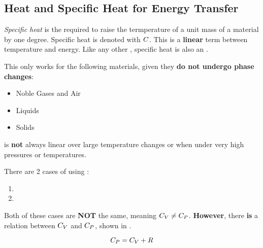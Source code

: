 \subsection{Heat and Specific Heat for Energy Transfer}\label{subsec:Heat_Specific_Heat_Energy_Transfer}
\begin{definition}\label{def:Specific_Heat}
  \emph{Specific heat} is the  required to raise the termperature of a unit mass of a material by one degree.
  Specific heat is denoted with $C$.
  This is a \textbf{linear} term between temperature and energy.
  Like any other , specific heat is also an .

  \begin{remark}
    This  only works for the following materials, given they \textbf{do not undergo phase changes}:
    \begin{itemize}[noitemsep]
    \item Noble Gases and Air
    \item Liquids
    \item Solids
    \end{itemize}
  \end{remark}

  \begin{remark}
     is \textbf{not} always linear over large temperature changes or when under very high pressures or temperatures.
  \end{remark}
\end{definition}

There are 2 cases of using :
\begin{enumerate}[noitemsep]
\item {}
\item {}
\end{enumerate}

Both of these cases are \textbf{NOT} the same, meaning $C_{V} \neq C_{P}$.
{\large\textbf{However}}, there \textbf{is} a relation between $C_{V}$ and $C_{P}$, shown in .

\begin{equation}\label{eq:Specific_Heat_Constant_Volume_Constant_Pressure_Relation}
  C_{P} = C_{V} + R
\end{equation}

